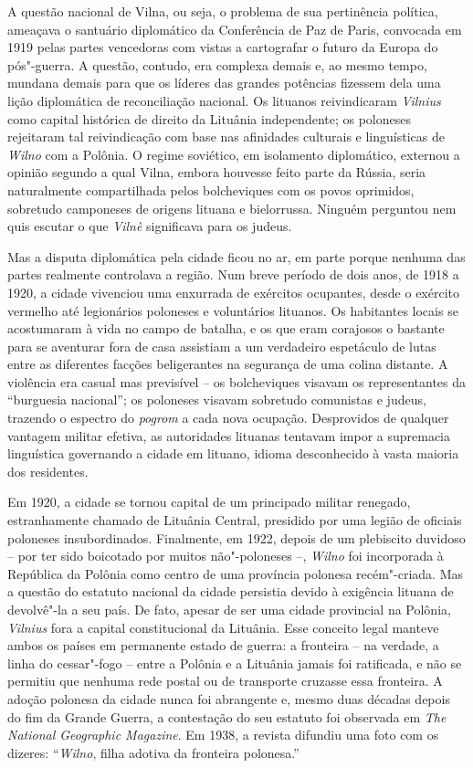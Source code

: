 A questão nacional de Vilna, ou seja, o problema de sua pertinência
política, ameaçava o santuário diplomático da Conferência de Paz de
Paris, convocada em 1919 pelas partes vencedoras com vistas a
cartografar o futuro da Europa do pós"-guerra. A questão, contudo, era
complexa demais e, ao mesmo tempo, mundana demais para que os líderes
das grandes potências fizessem dela uma lição diplomática de
reconciliação nacional. Os lituanos reivindicaram \textit{Vilnius} como capital
histórica de direito da Lituânia independente; os poloneses rejeitaram
tal reivindicação com base nas afinidades culturais e linguísticas de
\textit{Wilno} com a Polônia. O regime soviético, em isolamento diplomático,
externou a opinião segundo a qual Vilna, embora houvesse feito parte da
Rússia, seria naturalmente compartilhada pelos bolcheviques com os povos
oprimidos, sobretudo camponeses de origens lituana e bielorrussa. Ninguém
perguntou nem quis escutar o que \textit{Vilnè} significava para os judeus.

Mas a disputa diplomática pela cidade ficou no ar, em parte porque
nenhuma das partes realmente controlava a região. Num breve período de
dois anos, de 1918 a 1920, a cidade vivenciou uma enxurrada de exércitos
ocupantes, desde o exército vermelho até legionários poloneses e
voluntários lituanos. Os habitantes locais se acostumaram à vida no
campo de batalha, e os que eram corajosos o bastante para se aventurar
fora de casa assistiam a um verdadeiro espetáculo de lutas entre as
diferentes facções beligerantes na segurança de uma colina distante. A
violência era casual mas previsível -- os bolcheviques visavam os
representantes da ``burguesia nacional''; os poloneses visavam sobretudo
comunistas e judeus, trazendo o espectro do \textit{pogrom} a cada nova ocupação.
Desprovidos de qualquer vantagem militar efetiva, as autoridades
lituanas tentavam impor a supremacia linguística governando a cidade em
lituano, idioma desconhecido à vasta maioria dos residentes.

Em 1920, a cidade se tornou capital de um principado militar renegado,
estranhamente chamado de Lituânia Central, presidido por uma legião de
oficiais poloneses insubordinados. Finalmente, em 1922, depois de um
plebiscito duvidoso -- por ter sido boicotado por muitos não"-poloneses --,
\textit{Wilno} foi incorporada à República da Polônia como centro de uma
província polonesa recém"-criada. Mas a questão do estatuto nacional da
cidade persistia devido à exigência lituana de devolvê"-la a seu país. De
fato, apesar de ser uma cidade provincial na Polônia, \textit{Vilnius} fora a
capital constitucional da Lituânia. Esse conceito legal manteve ambos os
países em permanente estado de guerra: a fronteira -- na verdade, a linha
do cessar"-fogo -- entre a Polônia e a Lituânia jamais foi ratificada, e
não se permitiu que nenhuma rede postal ou de transporte cruzasse essa
fronteira. A adoção polonesa da cidade nunca foi abrangente e, mesmo
duas décadas depois do fim da Grande Guerra, a contestação do seu
estatuto foi observada em \textit{The National Geographic Magazine}. Em
1938, a revista difundiu uma foto com os dizeres: ``\textit{Wilno}, filha adotiva
da fronteira polonesa.''

